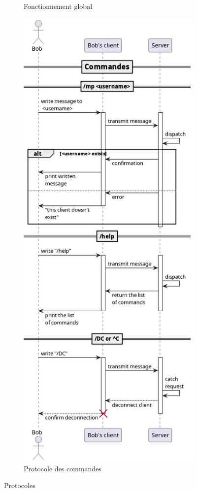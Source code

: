 \documentclass[a4paper,12pt]{article}
\begin{document}
\begin{figure}[h]
\begin{subfigure}{0.45\linewidth}
		\caption{Fonctionnement global}
	\end{subfigure}
	\hfill
	\begin{subfigure}{0.45\linewidth}
		\includegraphics[width=0.8\linewidth]{commands.png}
		\caption{Protocole des commandes}
	\end{subfigure}
	\caption{Protocoles}
	\hrulefill
\end{figure}
\end{document}
